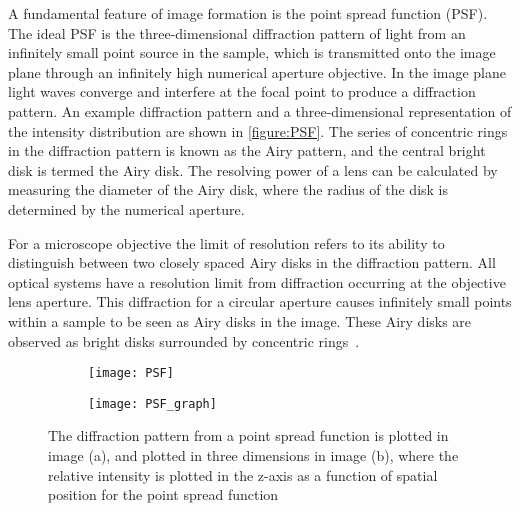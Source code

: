 A fundamental feature of image formation is the point spread function (PSF). The ideal PSF is the three-dimensional diffraction pattern of light from an infinitely small point source in the sample, which is transmitted onto the image plane through an infinitely high numerical aperture objective. In the image plane light waves converge and interfere at the focal point to produce a diffraction pattern. An example diffraction pattern and a three-dimensional representation of the intensity distribution are shown in \autoref{figure:PSF}. The series of concentric rings in the diffraction pattern is known as the Airy pattern, and the central bright disk is termed the Airy disk. The resolving power of a lens can be calculated by measuring the diameter of the Airy disk, where the radius of the disk is determined by the numerical aperture.

For a microscope objective the limit of resolution refers to its ability to distinguish between two closely spaced Airy disks in the diffraction pattern. All optical systems have a resolution limit from diffraction occurring at the objective lens aperture. This diffraction for a circular aperture causes infinitely small points within a sample to be seen as Airy disks in the image. These Airy disks are observed as bright disks surrounded by concentric rings~\cite{Spector2006}.

\begin{figure}[htbp!]\centering
\hspace*{\fill}
	\begin{subfigure}[b]{0.42\linewidth}
		\centering
		\texttt{[image: PSF]}
		\caption{}
		\label{figure:introduction:PSF:image}
	\end{subfigure}
	\hfill
	\begin{subfigure}[b]{0.42\linewidth}
		\centering
		\texttt{[image: PSF\_graph]}
		\caption{}
		\label{figure:introduction:PSF:graph}
	\end{subfigure}
\hspace*{\fill}
\caption[Point spread function]{The diffraction pattern from a point spread function is plotted in image (a), and plotted in three dimensions in image (b), where  the relative intensity is plotted in the z-axis as a function of spatial position for the point spread function}
\label{figure:PSF}
\end{figure}

